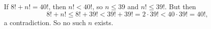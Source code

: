 If $8!+n!=40!$, then $n!<40!$, so $n\le39$ and $n!\le39!$. But then
\[
8!+n!\le8!+39!<39!+39!=2\cdot39!<40\cdot39!=40!,
\]
a contradiction. So $\boxed{\text{no such }n}$ exists.
